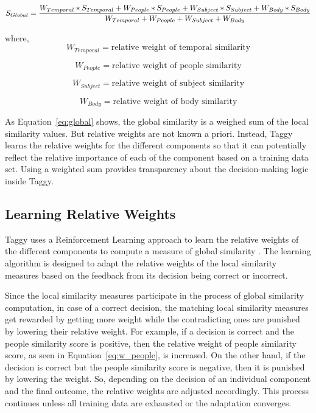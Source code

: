 \begin{equation}
	\label{eq:global}
S_{Global} = \frac{W_{Temporal} * S_{Temporal} + W_{People} * S_{People} + W_{Subject} * S_{Subject} + W_{Body} * S_{Body}} {W_{Temporal} + W_{People} + W_{Subject} + W_{Body}}\\
\end{equation}

where,
\begin{equation}
	\label{eq:w_temporal}	
W_{Temporal} = \mbox{relative weight of temporal similarity}
\end{equation}      

\begin{equation}   
		\label{eq:w_people}
W_{People} = \mbox{relative weight of people similarity}
\end{equation}

\begin{equation}     
		\label{eq:w_subject}
W_{Subject} = \mbox{relative weight of subject similarity}
\end{equation}

\begin{equation}     
		\label{eq:w_body}
W_{Body} = \mbox{relative weight of body similarity}
\end{equation}

As Equation~\ref{eq:global} shows, the global similarity is a weighed sum of the local similarity values. But relative weights are not known a priori. Instead, Taggy learns the relative weights for the different components so that it can potentially reflect the relative importance of each of the component based on a training data set. Using a weighted sum provides transparency about the decision-making logic inside Taggy.
	
\subsection{Learning Relative Weights}	
Taggy uses a Reinforcement Learning approach to learn the relative weights of the different components to compute a measure of global similarity \cite{reinforcement_learning}. The learning algorithm is designed to adapt the relative weights of the local similarity measures based on the feedback from its decision being correct or incorrect.

Since the local similarity measures participate in the process of global similarity computation, in case of a correct decision, the matching local similarity measures get rewarded by getting more weight while the contradicting ones are punished by lowering their relative weight. For example, if a decision is correct and the people similarity score is positive, then the relative weight of people similarity score, as seen in Equation~\ref{eq:w_people}, is increased. On the other hand, if the decision is correct but the people similarity score is negative, then it is punished by lowering the weight. So, depending on the decision of an individual component and the final outcome, the relative weights are adjusted accordingly. This process continues unless all training data are exhausted or the adaptation converges.

